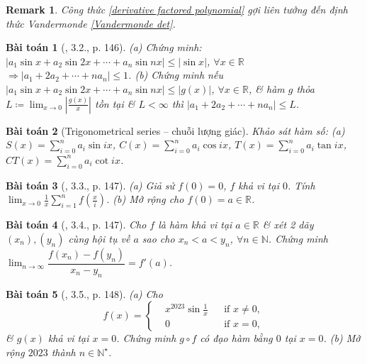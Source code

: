 \documentclass{article}
\newtheorem{baitoan}{Bài toán}
\newtheorem{remark}{Remark}
\begin{document}
\begin{remark}
	Công thức \eqref{derivative factored polynomial} gợi liên tưởng đến định thức Vandermonde \eqref{Vandermonde det}.
\end{remark}

\begin{baitoan}[\cite{Quoc_Long_Dat_Nam_VMC}, 3.2., p. 146]
	(a) Chứng minh: $|a_1\sin x + a_2\sin2x + \cdots + a_n\sin nx|\le|\sin x|$, $\forall x\in\mathbb{R}$ $\Rightarrow|a_1 + 2a_2 + \cdots + na_n|\le1$. (b) Chứng minh nếu $|a_1\sin x + a_2\sin2x + \cdots + a_n\sin nx|\le|g(x)|$, $\forall x\in\mathbb{R}$, \& hàm $g$ thỏa $L\coloneqq\lim_{x\to0} \left|\frac{g(x)}{x}\right|$ tồn tại \& $L < \infty$ thì $|a_1 + 2a_2 + \cdots + na_n|\le L$.
\end{baitoan}

\begin{baitoan}[Trigonometrical series -- chuỗi lượng giác]
	Khảo sát hàm số: (a) $S(x) = \sum_{i=0}^n a_i\sin ix$, $C(x) = \sum_{i=0}^n a_i\cos ix$, $T(x) = \sum_{i=0}^n a_i\tan ix$, $CT(x) = \sum_{i=0}^n a_i\cot ix$.
\end{baitoan}

\begin{baitoan}[\cite{Quoc_Long_Dat_Nam_VMC}, 3.3., p. 147]
	(a) Giả sử $f(0) = 0$, $f$ khả vi tại $0$. Tính $\lim_{x\to0} \frac{1}{x}\sum_{i=1}^n f\left(\frac{x}{i}\right)$. (b) Mở rộng cho $f(0) = a\in\mathbb{R}$.
\end{baitoan}

\begin{baitoan}[\cite{Quoc_Long_Dat_Nam_VMC}, 3.4., p. 147]
	Cho $f$ là hàm khả vi tại $a\in\mathbb{R}$ \& xét 2 dãy $(x_n),(y_n)$ cùng hội tụ về $a$ sao cho $x_n < a < y_n$, $\forall n\in\mathbb{N}$. Chứng minh $\lim_{n\to\infty} \dfrac{f(x_n) - f(y_n)}{x_n - y_n} = f'(a)$.
\end{baitoan}

\begin{baitoan}[\cite{Quoc_Long_Dat_Nam_VMC}, 3.5., p. 148]
	(a) Cho
	\begin{equation*}
		f(x) = \left\{\begin{split}
			&x^{2023}\sin\frac{1}{x}&&\mbox{if } x\ne0,\\
			&0&&\mbox{if } x = 0,
		\end{split}\right.
	\end{equation*}
	\& $g(x)$ khả vi tại $x = 0$. Chứng minh $g\circ f$ có đạo hàm bằng $0$ tại $x = 0$. (b) Mở rộng $2023$ thành $n\in\mathbb{N}^\star$.
\end{baitoan}
\end{document}
